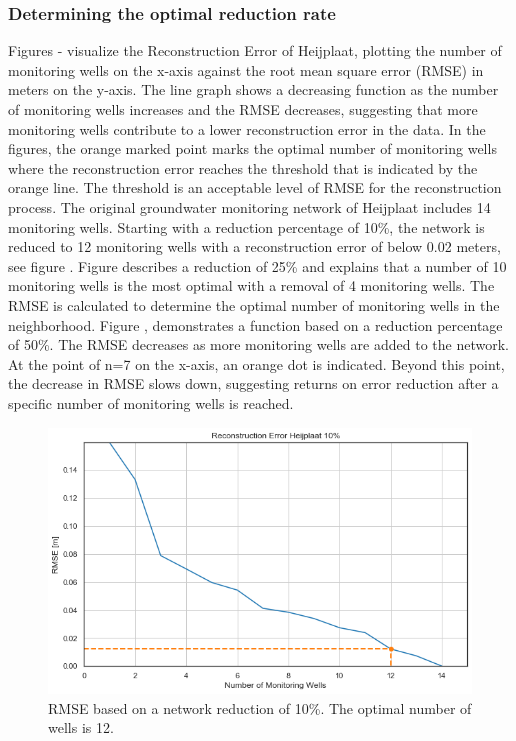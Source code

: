 \subsubsection{Determining the optimal reduction rate}
Figures - visualize the Reconstruction Error of Heijplaat, plotting the number of monitoring wells on the x-axis against the root mean square error (RMSE) in meters on the y-axis. The line graph shows a decreasing function as the number of monitoring wells increases and the RMSE decreases, suggesting that more monitoring wells contribute to a lower reconstruction error in the data. In the figures, the orange marked point marks the optimal number of monitoring wells where the reconstruction error reaches the threshold that is indicated by the orange line. The threshold is an acceptable level of RMSE for the reconstruction process. The original groundwater monitoring network of Heijplaat includes 14 monitoring wells. 
\newline
Starting with a reduction percentage of 10\%, the network is reduced to 12 monitoring wells with a reconstruction error of below 0.02 meters, see figure . Figure  describes a reduction of 25\% and explains that a number of 10 monitoring wells is the most optimal with a removal of 4 monitoring wells. The RMSE is calculated to determine the optimal number of monitoring wells in the neighborhood. Figure , demonstrates a function based on a reduction percentage of 50\%. The RMSE decreases as more monitoring wells are added to the network. At the point of n=7 on the x-axis, an orange dot is indicated. Beyond this point, the decrease in RMSE slows down, suggesting returns on error reduction after a specific number of monitoring wells is reached. 
\begin{figure}[htbp]
    \centering
    \includegraphics[width=0.5\linewidth]{frontmatter/Heijplaat-fig/new10.png}
    \caption{RMSE based on a network reduction of 10\%. The optimal number of wells is 12.}
    \label{heij10}
\end{figure}

